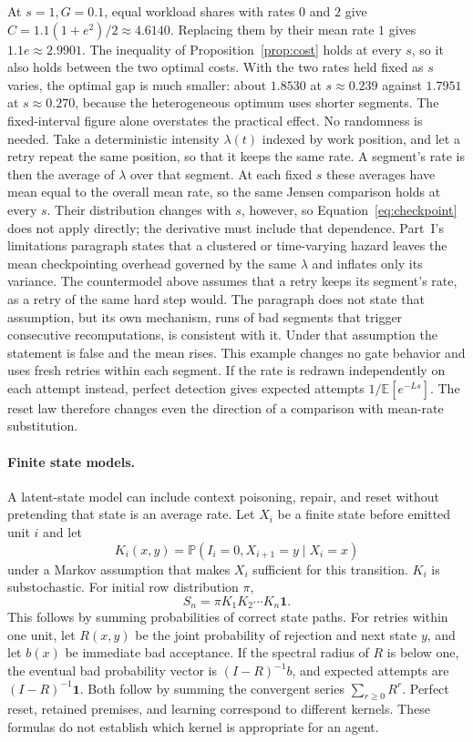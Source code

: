 \documentclass[11pt]{article}
\theoremstyle{definition}
\theoremstyle{remark}
\newcommand{\Prb}{\mathbb P}
\newcommand{\E}{\mathbb E}
\begin{document}
At $s=1,G=0.1$, equal workload shares with rates $0$ and $2$ give
$C=1.1(1+e^2)/2\approx4.6140$. Replacing them by their mean rate $1$ gives
$1.1e\approx2.9901$. The inequality of Proposition~\ref{prop:cost} holds at every $s$, so it
also holds between the two optimal costs. With the two rates held fixed as $s$ varies, the
optimal gap is much smaller: about $1.8530$ at $s\approx0.239$ against $1.7951$ at
$s\approx0.270$, because the heterogeneous optimum uses shorter segments. The fixed-interval
figure alone overstates the practical effect.
No randomness is needed. Take a deterministic intensity $\lambda(t)$ indexed by work position,
and let a retry repeat the same position, so that it keeps the same rate. A segment's rate is
then the average of $\lambda$ over that segment. At each fixed $s$ these averages have mean
equal to the overall mean rate, so the same Jensen comparison holds at every $s$. Their
distribution changes with $s$, however, so Equation~\eqref{eq:checkpoint} does not apply
directly; the derivative must include that dependence.
Part~I's limitations paragraph states that a clustered or time-varying hazard leaves the mean
checkpointing overhead governed by the same $\lambda$ and inflates only its variance. The
countermodel above assumes that a retry keeps its segment's rate, as a retry of the same hard
step would. The paragraph does not state that assumption, but its own mechanism, runs of bad
segments that trigger consecutive recomputations, is consistent with it. Under that assumption
the statement is false and the mean rises.
This example changes no gate behavior and uses fresh retries within each segment.
If the rate is redrawn independently on each attempt instead, perfect detection gives
expected attempts $1/\E[e^{-Ls}]$. The reset law therefore changes even the direction of a
comparison with mean-rate substitution.

\paragraph{Finite state models.}
A latent-state model can include context poisoning, repair, and reset without pretending that
state is an average rate. Let $X_i$ be a finite state before emitted unit $i$ and let
\[
K_i(x,y)=\Prb(I_i=0,X_{i+1}=y\mid X_i=x)
\]
under a Markov assumption that makes $X_i$ sufficient for this transition. $K_i$ is
substochastic. For initial row distribution $\pi$,
\begin{equation}\label{eq:kernel}
S_n=\pi K_1K_2\cdots K_n\mathbf1.
\end{equation}
This follows by summing probabilities of correct state paths. For retries within one unit,
let $R(x,y)$ be the joint probability of rejection and next state $y$, and let $b(x)$ be
immediate bad acceptance. If the spectral radius of $R$ is below one, the eventual bad
probability vector is $(I-R)^{-1}b$, and expected attempts are $(I-R)^{-1}\mathbf1$.
Both follow by summing the convergent series $\sum_{r\ge0}R^r$.
Perfect reset, retained premises, and learning correspond to different kernels. These formulas
do not establish which kernel is appropriate for an agent.
\end{document}
